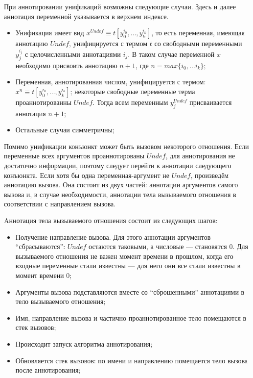 При аннотировании унификаций возможны следующие случаи. 
Здесь и далее аннотация переменной указывается в верхнем индексе.
\begin{itemize}
    \item Унификация имеет вид $x^{Undef} \equiv t[y_0^{i_0}, \dots, y_k^{i_k}]$, то есть переменная, имеющая аннотацию $Undef$, унифицируется с термом $t$ со свободными переменными $y_j^{i_j}$ с целочисленными аннотациями $i_j$. В таком случае переменной $x$ необходимо присвоить аннотацию $n + 1$, где $n = max \{ i_0, \dots i_k\}$;
    \item Переменная, аннотированная числом, унифицируется с термом: $x^{n} \equiv t[y_0^{i_0}, \dots, y_k^{i_k}]$; некоторые свободные переменные терма проаннотированны $Undef$.
    Тогда всем переменным $y_j^{Undef}$ присваивается аннотация $n+1$;
    \item Остальные случаи симметричны;
\end{itemize}

Помимо унификации конъюнкт может быть вызовом некоторого отношения.
Если переменные всех аргументов проаннотированы $Undef$, для аннотирования не достаточно информации, поэтому следует перейти к аннотации следующего конъюнкта.
Если хотя бы одна переменная-аргумент не $Undef$, произведём аннотацию вызова.
Она состоит из двух частей: аннотации аргументов самого вызова и, в случае необходимости, аннотации тела вызываемого отношения в соответствии с направлением вызова.

Aннотация тела вызываемого отношения состоит из следующих шагов:
\begin{itemize}
    \item Получение направление вызова. Для этого аннотации аргументов ``сбрасываются'': $Undef$ остаются таковыми, а числовые --- становятся $0$. Для вызываемого отношения не важен момент времени в прошлом, когда его входные переменные стали известны --- для него они все стали известны в момент времени $0$;
    \item Аргументы вызова подставляются вместе со ``сброшенными'' аннотациями в тело вызываемого отношения;
    \item Имя, направление вызова и частично проаннотированное тело помещаются в стек вызовов;
    \item Происходит запуск алгоритма аннотирования;
    \item Обновляется стек вызовов: по имени и направлению помещается тело вызова после аннотирования;
\end{itemize}

